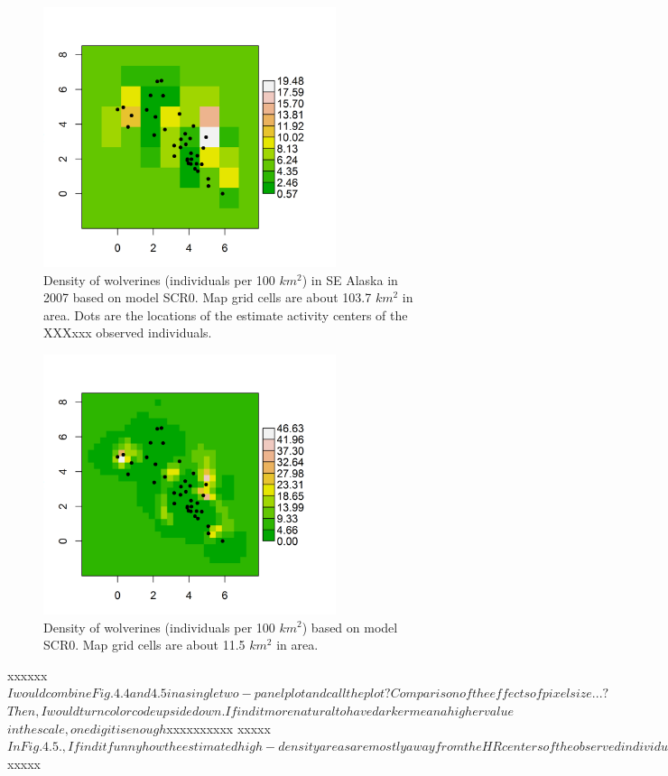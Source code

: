 {\begin{figure}
\begin{center}
\includegraphics[height=3in,width=3.375in]{Ch4/figs/density10x10}
\end{center}
\caption{Density of wolverines (individuals per 100 $km^2$) in SE Alaska in 2007 based on
  model SCR0. Map grid cells are about 103.7 $km^2$ in area. Dots are the locations of the estimate activity centers of the XXXxxx observed individuals.}
\label{scr0.fig.density10x10}
\end{figure}

\begin{figure}
\begin{center}
\includegraphics[height=3in,width=3.375in]{Ch4/figs/density30x30}
\end{center}
\caption{Density of wolverines (individuals per 100 $km^2$) based on
  model SCR0. Map grid cells are about 11.5 $km^2$ in area.}
\label{scr0.fig.density20x20}
\end{figure}
xxxxxx
$I would combine Fig. 4.4 and 4.5 in a single two-panel plot and call the plot ?Comparison of the effects of pixel size ...?$
$Then, I would turn color code upside down. I find it more natural to have darker mean a higher value$
$in the scale , one digit is enough$xxxxxxxxxx
xxxxx
$In Fig. 4.5., I find it funny how the estimated high-density areas are mostly away from the HR centers of the observed individuals$xxxxx

}
